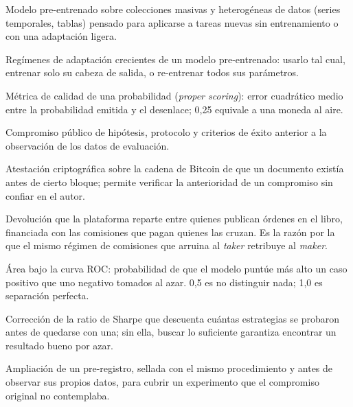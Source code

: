 \begin{description}[align=left, leftmargin=3.2cm, labelwidth=3cm, font=\bfseries]
\item[Modelo fundacional] Modelo pre-entrenado sobre colecciones masivas y heterogéneas
de datos (series temporales, tablas) pensado para aplicarse a tareas nuevas sin
entrenamiento o con una adaptación ligera.
\item[Zero-shot / linear-probing / fine-tuning] Regímenes de adaptación crecientes de un
modelo pre-entrenado: usarlo tal cual, entrenar solo su cabeza de salida, o re-entrenar
todos sus parámetros.
\item[Puntuación de Brier] Métrica de calidad de una probabilidad (\emph{proper scoring}):
error cuadrático medio entre la probabilidad emitida y el desenlace; 0,25 equivale a una
moneda al aire.
\item[Pre-registro] Compromiso público de hipótesis, protocolo y criterios de éxito
anterior a la observación de los datos de evaluación.
\item[Sello de tiempo (OpenTimestamps)] Atestación criptográfica sobre la cadena de
Bitcoin de que un documento existía antes de cierto bloque; permite verificar la
anterioridad de un compromiso sin confiar en el autor.
\item[\emph{Rebate} de liquidez] Devolución que la plataforma reparte entre quienes
publican órdenes en el libro, financiada con las comisiones que pagan quienes las cruzan.
Es la razón por la que el mismo régimen de comisiones que arruina al \emph{taker}
retribuye al \emph{maker}.
\item[AUC] Área bajo la curva ROC: probabilidad de que el modelo puntúe más alto un caso
positivo que uno negativo tomados al azar. 0,5 es no distinguir nada; 1,0 es separación
perfecta.
\item[Ratio de Sharpe deflactada] Corrección de la ratio de Sharpe que descuenta cuántas
estrategias se probaron antes de quedarse con una; sin ella, buscar lo suficiente garantiza
encontrar un resultado bueno por azar.
\item[Adenda] Ampliación de un pre-registro, sellada con el mismo procedimiento y antes de
observar sus propios datos, para cubrir un experimento que el compromiso original no
contemplaba.
\end{description}
